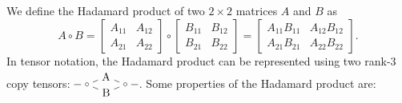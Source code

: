 \documentclass[oneside]{book}
\newcommand\sbullet[1][1.5pt]{%
  \tikz[baseline=-0.5ex]\draw (0,0) circle (#1);%
}
\begin{document}
We define the Hadamard product of two $2\times 2$ matrices $A$ and $B$ as
\[
   \renewcommand*{\arraystretch}{1.3}
   A \circ B = \begin{bmatrix} A_{11} & A_{12} \\ A_{21} & A_{22} \end{bmatrix} \circ
              \begin{bmatrix} B_{11} & B_{12} \\ B_{21} & B_{22} \end{bmatrix}
            = \begin{bmatrix} A_{11}B_{11} & A_{12}B_{12} \\ A_{21}B_{21} & A_{22}B_{22} \end{bmatrix}
   .
\]
In tensor notation, the Hadamard product can be represented using two rank-3 copy tensors:
$
   \begin{tikzpicture}[baseline=-.25em]
      \node (c0) at (0,0) {$\sbullet$};
      \node (A) at (.6,.25) {A};
      \node (B) at (.6,-.25) {B};
      \node (c1) at (1.2,0) {$\sbullet$};
      \draw (c0) -- (A) -- (c1);
      \draw (c0) -- (B) -- (c1);
      \draw (c0) -- ++(-.4,0);
      \draw (c1) -- ++(.4,0);
   \end{tikzpicture}
$.
Some properties of the Hadamard product are:
\end{document}

